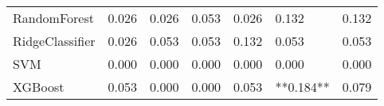 \begin{tabular}{lllllll}
                   RandomForest & 0.026 &                     0.026 &                 0.053 &                  0.026 &                                   0.132 &    0.132 \\
                RidgeClassifier & 0.026 &                     0.053 &                 0.053 &                  0.132 &                                   0.053 &    0.053 \\
                            SVM & 0.000 &                     0.000 &                 0.000 &                  0.000 &                                   0.000 &    0.000 \\
                        XGBoost & 0.053 &                     0.000 &                 0.000 &                  0.053 &                               **0.184** &    0.079 \\
\bottomrule
\end{tabular}
